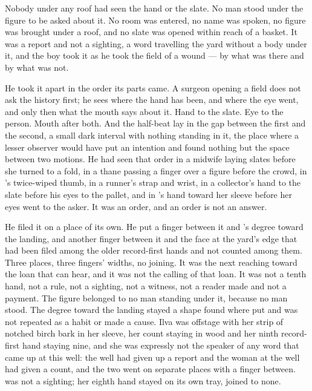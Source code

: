 Nobody under any roof had seen the hand or the slate. No man stood under the figure to be asked about it. No room was entered, no name was spoken, no figure was brought under a roof, and no slate was opened within reach of a basket. It was a report and not a sighting, a word travelling the yard without a body under it, and the boy took it as he took the field of a wound --- by what was there and by what was not.

He took it apart in the order its parts came. A surgeon opening a field does not ask the history first; he sees where the hand has been, and where the eye went, and only then what the mouth says about it. Hand to the slate. Eye to the person. Mouth after both. And the half-beat lay in the gap between the first and the second, a small dark interval with nothing standing in it, the place where a lesser observer would have put an intention and found nothing but the space between two motions. He had seen that order in a midwife laying slates before she turned to a fold, in a thane passing a finger over a figure before the crowd, in 's twice-wiped thumb, in a runner's strap and wrist, in a collector's hand to the slate before his eyes to the pallet, and in 's hand toward her sleeve before her eyes went to the asker. It was an order, and an order is not an answer.

He filed it on a place of its own. He put a finger between it and 's degree toward the landing, and another finger between it and the face at the yard's edge that had been filed among the older record-first hands and not counted among them. Three places, three fingers' widths, no joining. It was the next reaching toward the loan that can hear, and it was not the calling of that loan. It was not a tenth hand, not a rule, not a sighting, not a witness, not a reader made and not a payment. The figure belonged to no man standing under it, because no man stood. The degree toward the landing stayed a shape found where put and was not repeated as a habit or made a cause. Ilva was offstage with her strip of notched birch bark in her sleeve, her count staying in wood and her ninth record-first hand staying nine, and she was expressly not the speaker of any word that came up at this well: the well had given up a report and the woman at the well had given a count, and the two went on separate places with a finger between.  was not a sighting; her eighth hand stayed on its own tray, joined to none.


